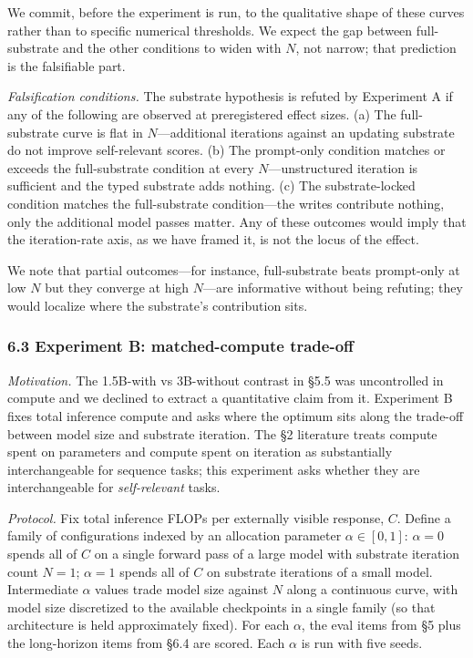 \documentclass[11pt,letterpaper]{article}
\begin{document}
We commit, before the experiment is run, to the qualitative shape of these curves rather than to specific numerical thresholds. We expect the gap between full-substrate and the other conditions to widen with $N$, not narrow; that prediction is the falsifiable part.

\emph{Falsification conditions.} The substrate hypothesis is refuted by Experiment A if any of the following are observed at preregistered effect sizes. (a) The full-substrate curve is flat in $N$---additional iterations against an updating substrate do not improve self-relevant scores. (b) The prompt-only condition matches or exceeds the full-substrate condition at every $N$---unstructured iteration is sufficient and the typed substrate adds nothing. (c) The substrate-locked condition matches the full-substrate condition---the writes contribute nothing, only the additional model passes matter. Any of these outcomes would imply that the iteration-rate axis, as we have framed it, is not the locus of the effect.

We note that partial outcomes---for instance, full-substrate beats prompt-only at low $N$ but they converge at high $N$---are informative without being refuting; they would localize where the substrate's contribution sits.

\subsubsection*{6.3 Experiment B: matched-compute trade-off}

\emph{Motivation.} The 1.5B-with vs 3B-without contrast in §5.5 was uncontrolled in compute and we declined to extract a quantitative claim from it. Experiment B fixes total inference compute and asks where the optimum sits along the trade-off between model size and substrate iteration. The §2 literature treats compute spent on parameters and compute spent on iteration as substantially interchangeable for sequence tasks; this experiment asks whether they are interchangeable for \emph{self-relevant} tasks.

\emph{Protocol.} Fix total inference FLOPs per externally visible response, $C$. Define a family of configurations indexed by an allocation parameter $\alpha \in [0, 1]$: $\alpha = 0$ spends all of $C$ on a single forward pass of a large model with substrate iteration count $N = 1$; $\alpha = 1$ spends all of $C$ on substrate iterations of a small model. Intermediate $\alpha$ values trade model size against $N$ along a continuous curve, with model size discretized to the available checkpoints in a single family (so that architecture is held approximately fixed). For each $\alpha$, the eval items from §5 plus the long-horizon items from §6.4 are scored. Each $\alpha$ is run with five seeds.
\end{document}
